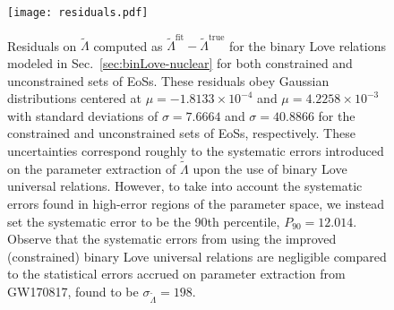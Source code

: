\documentclass[prd,twocolumn,nofootinbib,superscriptaddress,amsmath,amssymb]{revtex4-1}
\begin{document}
\begin{figure}
\begin{center} 
\texttt{[image: residuals.pdf]}
\end{center}
\caption{
Residuals on $\tilde\Lambda$ computed as $\tilde{\Lambda}^{\text{fit}}-\tilde{\Lambda}^{\text{true}}$ for the binary Love relations modeled in Sec.~\ref{sec:binLove-nuclear} for both constrained and unconstrained sets of EoSs.
These residuals obey Gaussian distributions centered at $\mu=-1.8133 \times 10^{-4}$ and $\mu=4.2258 \times 10^{-3}$ with standard deviations of $\sigma=7.6664$ and $\sigma=40.8866$ for the constrained and unconstrained sets of EoSs, respectively.
These uncertainties correspond roughly to the systematic errors introduced on the parameter extraction of $\tilde{\Lambda}$ upon the use of binary Love universal relations.
However, to take into account the systematic errors found in high-error regions of the parameter space, we instead set the systematic error to be the 90th percentile, $P_{90}=12.014$.
Observe that the systematic errors from using the improved (constrained) binary Love universal relations are negligible compared to the statistical errors accrued on parameter extraction from GW170817, found to be $\sigma_{\tilde{\Lambda}}=198$.
}
\label{fig:residuals}
\end{figure}

\end{document}
